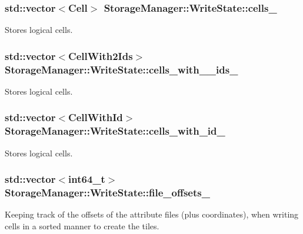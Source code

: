 \subsubsection[{cells\+\_\+}]{\setlength{\rightskip}{0pt plus 5cm}std\+::vector$<${\bf Cell}$>$ Storage\+Manager\+::\+Write\+State\+::cells\+\_\+}\label{structStorageManager_1_1WriteState_a5a6dfa8165c9591f51d383e4a45b2895}
Stores logical cells. \hypertarget{structStorageManager_1_1WriteState_a7d5e64047d6412bf0f2f851c2f2ec402}{}
\subsubsection[{cells\+\_\+with\+\_\+2\+\_\+ids\+\_\+}]{\setlength{\rightskip}{0pt plus 5cm}std\+::vector$<${\bf Cell\+With2\+Ids}$>$ Storage\+Manager\+::\+Write\+State\+::cells\+\_\+with\+\_\+\_\+ids\+\_\+}\label{structStorageManager_1_1WriteState_a7d5e64047d6412bf0f2f851c2f2ec402}
Stores logical cells. \hypertarget{structStorageManager_1_1WriteState_a460d73b47fc73edf91fa7babaa1d2543}{}
\subsubsection[{cells\+\_\+with\+\_\+id\+\_\+}]{\setlength{\rightskip}{0pt plus 5cm}std\+::vector$<${\bf Cell\+With\+Id}$>$ Storage\+Manager\+::\+Write\+State\+::cells\+\_\+with\+\_\+id\+\_\+}\label{structStorageManager_1_1WriteState_a460d73b47fc73edf91fa7babaa1d2543}
Stores logical cells. \hypertarget{structStorageManager_1_1WriteState_acd9557977b9b964b40981ce1114fcb93}{}
\subsubsection[{file\+\_\+offsets\+\_\+}]{\setlength{\rightskip}{0pt plus 5cm}std\+::vector$<$int64\+\_\+t$>$ Storage\+Manager\+::\+Write\+State\+::file\+\_\+offsets\+\_\+}\label{structStorageManager_1_1WriteState_acd9557977b9b964b40981ce1114fcb93}
Keeping track of the offsets of the attribute files (plus coordinates), when writing cells in a sorted manner to create the tiles. \hypertarget{structStorageManager_1_1WriteState_a2f0d2f44d73d97bcbcdb627562f86dce}{}
